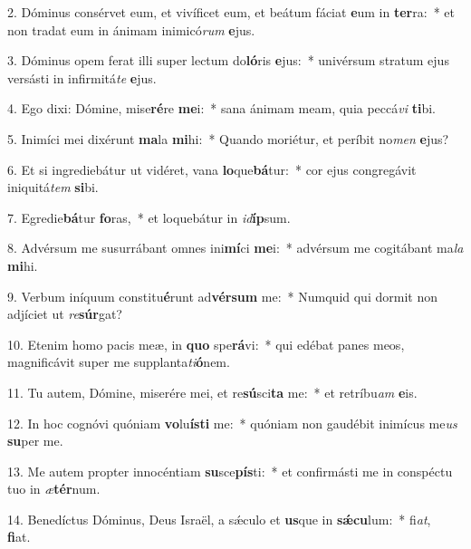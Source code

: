2. Dóminus consérvet eum, et vivíficet eum, et beátum fáciat \textbf{e}um in \textbf{ter}ra:~*  et non tradat eum in ánimam inimicó\textit{rum} \textbf{e}jus.\

3. Dóminus opem ferat illi super lectum do\textbf{ló}ris \textbf{e}jus:~*  univérsum stratum ejus versásti in infirmitá\textit{te} \textbf{e}jus.\

4. Ego dixi: Dómine, mise\textbf{ré}re \textbf{me}i:~*  sana ánimam meam, quia peccá\textit{vi} \textbf{ti}bi.\

5. Inimíci mei dixérunt \textbf{ma}la \textbf{mi}hi:~*  Quando moriétur, et períbit no\textit{men} \textbf{e}jus?\

6. Et si ingrediebátur ut vidéret, vana \textbf{lo}que\textbf{bá}tur:~*  cor ejus congregávit iniquitá\textit{tem} \textbf{si}bi.\

7. Egredie\textbf{bá}tur \textbf{fo}ras,~*  et loquebátur in \textit{id}\textbf{íp}sum.\

8. Advérsum me susurrábant omnes ini\textbf{mí}ci \textbf{me}i:~*  advérsum me cogitábant ma\textit{la} \textbf{mi}hi.\

9. Verbum iníquum constitu\textbf{é}runt ad\textbf{vér}\textbf{sum} me:~*  Numquid qui dormit non adjíciet ut \textit{re}\textbf{súr}gat?\

10. Etenim homo pacis meæ, in \textbf{quo} spe\textbf{rá}vi:~*  qui edébat panes meos, magnificávit super me supplanta\textit{ti}\textbf{ó}nem.\

11. Tu autem, Dómine, miserére mei, et re\textbf{sú}sci\textbf{ta} me:~*  et retríbu\textit{am} \textbf{e}is.\

12. In hoc cognóvi quóniam \textbf{vo}lu\textbf{ís}\textbf{ti} me:~*  quóniam non gaudébit inimícus me\textit{us} \textbf{su}per me.\

13. Me autem propter innocéntiam \textbf{su}sce\textbf{pís}ti:~*  et confirmásti me in conspéctu tuo in \textit{æ}\textbf{tér}num.\

14. Benedíctus Dóminus, Deus Israël, a sǽculo et \textbf{us}que in \textbf{sǽ}\textbf{cu}lum:~*  fi\textit{at}, \textbf{fi}at.\

